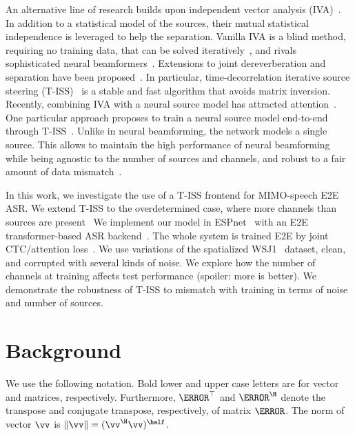 \documentclass[a4paper]{article}
\begin{document}
An alternative line of research builds upon independent vector analysis (IVA)~\cite{kimIndependentVectorAnalysis2006a,hiroeSolutionPermutationProblem2006}.
In addition to a statistical model of the sources, their mutual statistical independence is leveraged to help the separation.
Vanilla IVA is a blind method, requiring no training data, that can be solved iteratively~\cite{onoStableFastUpdate2011,scheiblerSurrogateSourceModel2021}, and rivals sophisticated neural beamformers~\cite{boeddeker_comparison_2021}.
Extensions to joint dereverberation and separation have been proposed~\cite{ilrma-t}.
In particular, time-decorrelation iterative source steering (T-ISS)~\cite{nakashimaJointDereverberationSeparation2021} is a stable and fast algorithm that avoids matrix inversion.
Recently, combining IVA with a neural source model has attracted attention~\cite{idlma,kameoka_supervised_2019}.
One particular approach proposes to train a neural source model end-to-end through T-ISS~\cite{scheiblerSurrogateSourceModel2021,saijo_tiss_2021}.
Unlike in neural beamforming, the network models a single source.
This allows to maintain the high performance of neural beamforming while being agnostic to the number of sources and channels, and robust to a fair amount of data mismatch~\cite{saijo_tiss_2021}.



In this work, we investigate the use of a T-ISS frontend for MIMO-speech E2E ASR.
We extend T-ISS to the overdetermined case, where more channels than sources are present~\cite{duComputationallyEfficientOverdeterminedBlind2021}
We implement our model in ESPnet~\cite{Watanabe:2018gy} with an E2E transformer-based ASR backend~\cite{karitaComparativeStudyTransformer2019}.
The whole system is trained E2E by joint CTC/attention loss~\cite{Joint-Kim2017}.
We use variations of the spatialized WSJ1~\cite{changMIMOSpeechEndtoendMultichannel2019} dataset, clean, and corrupted with several kinds of noise.
We explore how the number of channels at training affects test performance (spoiler: more is better).
We demonstrate the robustness of T-ISS to mismatch with training in terms of noise and number of sources.

\section{Background}

We use the following notation. Bold lower and upper case letters are for vector and matrices, respectively.
Furthermore, $\mA^\top$ and $\mA^\H$ denote the transpose and conjugate transpose, respectively, of matrix $\mA$.
The norm of vector $\vv$ is $\|\vv\| = (\vv^\H \vv)^{\half}$.
\end{document}
